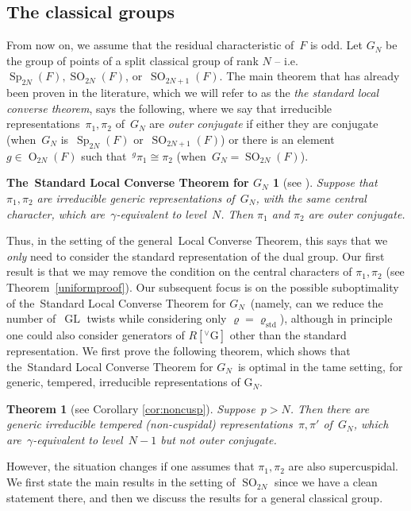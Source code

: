 \documentclass[12pt]{amsart}
\newcommand{\GL}{\operatorname{GL}}
\newcommand{\OO}{\operatorname{O}}
\newcommand{\SO}{\operatorname{SO}}
\newcommand{\G}{\mathrm{G}}
\newcommand{\Sp}{\operatorname{Sp}}
\def\rhostd{\varrho_{\mathrm{std}}} %
\def\vG{{}^\vee\G}
\newtheorem{thm}{Theorem}[section]
\newtheorem{thm}[equation]{Theorem}
\def\lcttheoremtitle{Local Converse Theorem}
\def\classicallcttheoremtitle{Standard Local Converse Theorem for $G_N$}
\newtheorem*{classicallcttheorem}{The~\classicallcttheoremtitle}
\begin{document}
\subsection{The classical groups}

From now on, we assume that the residual characteristic of~$F$ is odd. Let $G_N$ be the group of points of a split classical group of rank $N$ -- i.e.~$\Sp_{2N}(F),\SO_{2N}(F)$, or~$\SO_{2N+1}(F)$.  The main theorem that has already been proven in the literature, which we will refer to as the \emph{the standard local converse theorem}, says the following, where we say that irreducible representations~$\pi_1,\pi_2$ of~$G_N$ are \emph{outer conjugate} if either they are conjugate (when~$G_N$ is~$\Sp_{2N}(F)$ or~$\SO_{2N+1}(F)$) or there is an element~$g\in\OO_{2N}(F)$ such that~${}^g\pi_1\cong\pi_2$ (when~$G_N=\SO_{2N}(F)$).

\begin{classicallcttheorem}[see \cite{JS03, Z18, HZ23}]
Suppose that $\pi_1, \pi_2$ are irreducible generic representations of~$G_N$, with the same central character, which are~$\gamma$-equivalent to level~$N$. Then $\pi_1$ and $\pi_2$ are outer conjugate.
\end{classicallcttheorem}

Thus, in the setting of the general~\lcttheoremtitle, this says that we \emph{only} need to consider the standard representation of the dual group.  Our first result is that we may remove the condition on the central characters of $\pi_1, \pi_2$ (see Theorem~\ref{uniformproof}).  Our subsequent focus is on the possible suboptimality of the~\classicallcttheoremtitle\ (namely, can we reduce the number of~$\GL$ twists while considering only $\varrho = \rhostd$), although in principle one could also consider generators of $R[\vG]$ other than the standard representation.  We first prove the following theorem, which shows that the~\classicallcttheoremtitle\ is optimal in the tame setting, for generic, tempered, irreducible representations of $\G_N$.

\begin{thm}[see Corollary \ref{cor:noncusp}]
Suppose~$p>N$. Then there are generic irreducible tempered (non-cuspidal) representations~$\pi,\pi'$ of~$G_N$, which are~$\gamma$-equivalent to level~$N-1$ but not outer conjugate.
\end{thm}

However, the situation changes if one assumes that $\pi_1, \pi_2$ are also supercuspidal.  We first state the main results in the setting of $\SO_{2N}$ since we have a clean statement there, and then we discuss the results for a general classical group. 
\end{document}
